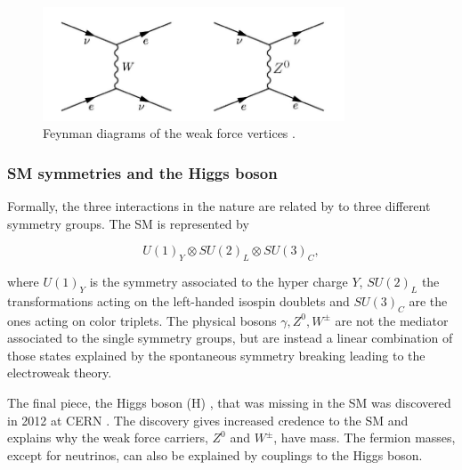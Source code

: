 \begin{figure}[H]
    \centering
    \includegraphics[width = 0.8\textwidth]{Figures/FeynmanDiagrams/weak.png}
    \caption{Feynman diagrams of the weak force vertices \cite{WEAKforce}.}
    \label{fig:weak_force_FD}
\end{figure}


\subsubsection{SM symmetries and the Higgs boson}
Formally, the three interactions in the nature are related by to three different symmetry groups. The SM is represented by

\begin{equation}
    U(1)_Y \otimes SU(2)_L \otimes SU(3)_C,
\end{equation}

where $U(1)_Y$ is the symmetry associated to the hyper charge $Y$, $SU(2)_L$ the transformations acting on the left-handed isospin doublets and $SU(3)_C$ are the ones acting on color triplets. The physical bosons $\gamma, Z^0, W^\pm$ are not the mediator associated to the single symmetry groups, but are instead a linear combination of those states explained by the spontaneous symmetry breaking leading to the electroweak theory. 

The final piece, the Higgs boson (H) \cite{thomson}, that was missing in the SM was discovered in 2012 at CERN \cite{Higgs_ATLAS, Higgs_CMS}. The discovery gives increased credence to the SM and explains why the weak force carriers, $Z^0$ and $ W^\pm $, have mass. The fermion masses, except for neutrinos, can also be explained by couplings to the Higgs boson. 

